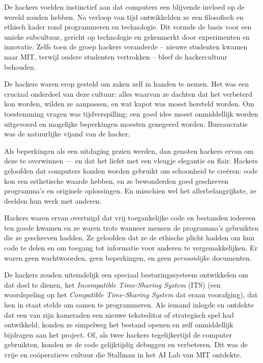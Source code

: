 \documentclass[
  a5paper,
  smalldemyvopaper,11pt,twoside,onecolumn,openright,extrafontsizes,
hidelinks]{memoir}
\begin{document}
De hackers voelden instinctief aan dat computers een blijvende invloed
op de wereld zouden hebben. Na verloop van tijd ontwikkelden ze een
filosofisch en ethisch kader rond programmeren en technologie. Dit
vormde de basis voor een unieke subcultuur, gericht op technologie en
gekenmerkt door experimenten en innovatie. Zelfs toen de groep hackers
veranderde -- nieuwe studenten kwamen naar MIT, terwijl oudere studenten
vertrokken -- bleef de hackercultuur behouden.

De hackers waren erop gesteld om zaken zelf in handen te nemen. Het was
een cruciaal onderdeel van deze cultuur: alles waarvan ze dachten dat
het verbeterd kon worden, wilden ze aanpassen, en wat kapot was moest
hersteld worden. Om toestemming vragen was tijdverspilling; een goed
idee moest onmiddellijk worden uitgevoerd en mogelijke beperkingen
moesten genegeerd worden. Bureaucratie was de natuurlijke vijand van de
hacker.

Als beperkingen als een uitdaging gezien werden, dan genoten hackers
ervan om deze te overwinnen --- en dat het liefst met een vleugje
elegantie en flair. Hackers geloofden dat computers konden worden
gebruikt om schoonheid te creëren: code kon een esthetische waarde
hebben, en ze bewonderden goed geschreven programma's en originele
oplossingen. En misschien wel het allerbelangrijkste, ze deelden hun
werk met anderen.

Hackers waren ervan overtuigd dat vrij toegankelijke code en bestanden
iedereen ten goede kwamen en ze waren trots wanneer mensen de
programma's gebruikten die ze geschreven hadden. Ze geloofden dat ze de
ethische plicht hadden om hun code te delen en om toegang tot informatie
voor anderen te vergemakkelijken. Er waren geen wachtwoorden, geen
beperkingen, en geen \emph{persoonlijke} documenten.

De hackers zouden uiteindelijk een speciaal besturingssysteem
ontwikkelen om dat doel te dienen, het \emph{Incompatible Time-Sharing
System} (ITS) (een woordspeling op het \emph{Compatible Time-Sharing
System} dat eraan voorafging), dat hen in staat stelde om samen te
programmeren. Als iemand inlogde en ontdekte dat een van zijn kameraden
een nieuwe teksteditor of strategisch spel had ontwikkeld, konden ze
simpelweg het bestand openen en zelf onmiddellijk bijdragen aan het
project. Of, als twee hackers tegelijkertijd de computer gebruikten,
konden ze de code gelijktijdig debuggen en verbeteren. Dit was de vrije
en coöperatieve cultuur die Stallman in het AI Lab van MIT ontdekte.
\end{document}
